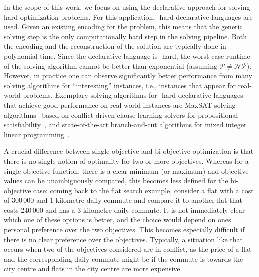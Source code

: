In the scope of this work, we focus on using the declarative approach for solving \NP-hard optimization problems.
For this application, \NP-hard declarative languages are used.
Given an existing encoding for the problem, this means that the generic solving step is the only computationally hard step in the solving pipeline.
Both the encoding and the reconstruction of the solution are typically done in polynomial time.
Since the declarative language is \NP-hard, the worst-case runtime of the solving algorithm cannot be better than exponential (assuming $\mathcal{P}\neq\mathcal{NP}$).
However, in practice one can observe significantly better performance from many solving algorithms for ``interesting'' instances, i.e., instances that appear for real-world problems.
Exemplary solving algorithms for \NP-hard declarative languages that achieve good performance on real-world instances are MaxSAT solving algorithms~\autocite{handbook2-maxsat} based on conflict driven clause learning solvers for propositional satisfiability~\autocite{handbook2-cdcl}, and state-of-the-art branch-and-cut algorithms for mixed integer linear programming~\autocite{ChenEtAl2010-branch-and-cut}.

A crucial difference between single-objective and bi-objective optimization is that there is no single notion of optimality for two or more objectives.
Whereas for a single objective function, there is a clear minimum (or maximum) and objective values can be unambiguously compared, this becomes less defined for the bi-objective case:
coming back to the flat search example, consider a flat with a cost of 300\,000 \texteuro{} and 1-kilometre daily commute and compare it to another flat that costs 240\,000 \texteuro{} and has a 3-kilometre daily commute.
It is not immediately clear which one of these options is better, and the choice would depend on ones personal preference over the two objectives.
This becomes especially difficult if there is no clear preference over the objectives.
Typically, a situation like that occurs when two of the objectives considered are in conflict, as the price of a flat and the corresponding daily commute might be if the commute is towards the city centre and flats in the city centre are more expensive.

